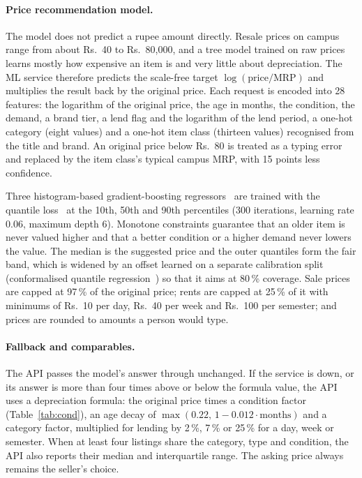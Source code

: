 \documentclass[12pt,letterpaper,twoside,openany]{report}
\begin{document}
\paragraph{Price recommendation model.} The model does not predict a rupee amount directly. Resale prices on
campus range from about Rs.~40 to Rs.~80{,}000, and a tree model trained on raw prices learns mostly how
expensive an item is and very little about depreciation. The ML service therefore predicts the scale-free
target $\log(\text{price}/\text{MRP})$ and multiplies the result back by the original price. Each request is
encoded into 28 features: the logarithm of the original price, the age in months, the condition, the demand,
a brand tier, a lend flag and the logarithm of the lend period, a one-hot category (eight values) and a
one-hot item class (thirteen values) recognised from the title and brand. An original price below Rs.~80 is
treated as a typing error and replaced by the item class's typical campus MRP, with 15 points less
confidence.

Three histogram-based gradient-boosting regressors~\cite{friedman,lightgbm} are trained with the quantile
loss~\cite{koenker} at the 10th, 50th and 90th percentiles (300 iterations, learning rate 0.06, maximum
depth 6). Monotone constraints guarantee that an older item is never valued higher and that a better
condition or a higher demand never lowers the value. The median is the suggested price and the outer
quantiles form the fair band, which is widened by an offset learned on a separate calibration split
(conformalised quantile regression~\cite{romano}) so that it aims at 80\,\% coverage. Sale prices are capped
at 97\,\% of the original price; rents are capped at 25\,\% of it with minimums of Rs.~10 per day, Rs.~40 per
week and Rs.~100 per semester; and prices are rounded to amounts a person would type.

\paragraph{Fallback and comparables.} The API passes the model's answer through unchanged. If the service is
down, or its answer is more than four times above or below the formula value, the API uses a depreciation
formula: the original price times a condition factor (Table~\ref{tab:cond}), an age decay of
$\max(0.22,\,1-0.012\cdot\text{months})$ and a category factor, multiplied for lending by 2\,\%, 7\,\% or
25\,\% for a day, week or semester. When at least four listings share the category, type and condition, the
API also reports their median and interquartile range. The asking price always remains the seller's choice.
\end{document}
